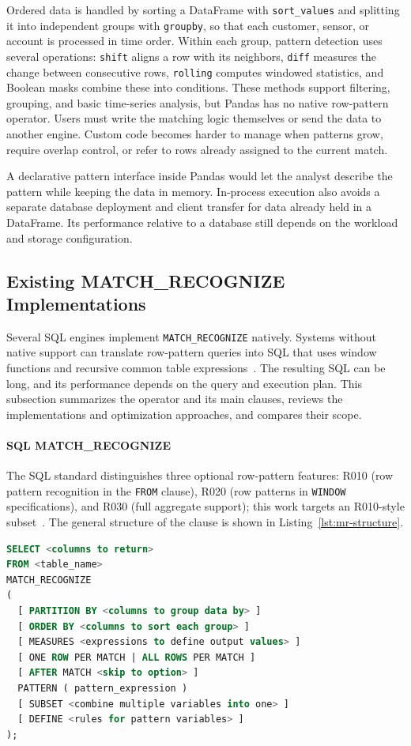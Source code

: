\documentclass[preprint,12pt,times,a4paper]{elsarticle}
\begin{document}
Ordered data is handled by sorting a DataFrame with \texttt{sort\_values} and
splitting it into independent groups with \texttt{groupby}, so that each
customer, sensor, or account is processed in time order. Within each group,
pattern detection uses several operations: \texttt{shift} aligns
a row with its neighbors, \texttt{diff} measures the change between consecutive
rows, \texttt{rolling} computes windowed statistics, and Boolean masks combine
these into conditions. These methods support filtering, grouping, and basic
time-series analysis, but Pandas has no native row-pattern operator. Users must
write the matching logic themselves or send the data to another engine. Custom
code becomes harder to manage when patterns grow, require overlap control, or
refer to rows already assigned to the current match.

A declarative pattern interface inside Pandas would let the analyst describe
the pattern while keeping the data in memory. In-process execution also avoids a
separate database deployment and client transfer for data already held in a
DataFrame. Its performance relative to a database still depends on the workload
and storage configuration.

\subsection{Existing MATCH\_RECOGNIZE Implementations}

Several SQL engines implement \texttt{MATCH\_RECOGNIZE} natively. Systems
without native support can translate row-pattern queries into SQL that uses
window functions and recursive common table
expressions~\cite{findling2025bringing,lambrecht2025democratize}. The resulting
SQL can be long, and its performance depends on the query and execution plan.
This subsection summarizes the operator and its
main clauses, reviews the implementations and optimization approaches, and
compares their scope.

\paragraph{SQL MATCH\_RECOGNIZE}
The SQL standard distinguishes three optional row-pattern features: R010 (row
pattern recognition in the \texttt{FROM} clause), R020 (row patterns in
\texttt{WINDOW} specifications), and R030 (full aggregate support); this work
targets an R010-style subset~\cite{iso9075_2_2016,ISO2021,petkovic2022rpr}. The general structure of
the clause is shown in Listing~\ref{lst:mr-structure}.
\begin{lstlisting}[language=SQL,frame=single,caption={General structure of the \texttt{MATCH\_RECOGNIZE} clause},label={lst:mr-structure}]
SELECT <columns to return>
FROM <table_name>
MATCH_RECOGNIZE
(
  [ PARTITION BY <columns to group data by> ]
  [ ORDER BY <columns to sort each group> ]
  [ MEASURES <expressions to define output values> ]
  [ ONE ROW PER MATCH | ALL ROWS PER MATCH ]
  [ AFTER MATCH <skip to option> ]
  PATTERN ( pattern_expression )
  [ SUBSET <combine multiple variables into one> ]
  [ DEFINE <rules for pattern variables> ]
);
\end{lstlisting}
\end{document}
